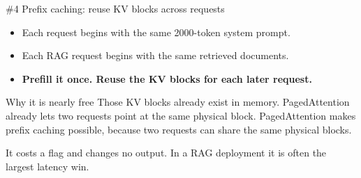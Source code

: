 \documentclass[aspectratio=169,10pt]{beamer}
\newcommand{\emphc}[1]{\textcolor{accent}{\textbf{#1}}}
\newcommand{\llmbase}{%
  \node[llmbox] (PF) at (0, 0) {Prefill};
  \node[llmbox] (KV) at (1.05, 0) {KV};
  \node[llmbox] (DC) at (1.95, 0) {Decode};
  \node[llmbox] (WP) at (0, -0.45) {Weights};
  \node[llmbox] (WD) at (1.95, -0.45) {Weights};
  \draw[llmar] (PF)--(KV); \draw[llmar] (KV)--(DC);
  \draw[llmar] (WP)--(PF); \draw[llmar] (WD)--(DC);
}
\newcommand{\llmoverlay}[1]{}  %
\newcommand{\llmdiagKV}{\llmoverlay{\begin{tikzpicture}[scale=0.65]\llmbase
  \node[llmbox, llmhl] at (1.05,0) {KV};\end{tikzpicture}}}
\begin{document}


\begin{frame}{\#4 Prefix caching: reuse KV blocks across requests}
  \llmdiagKV
  \begin{itemize}
    \item Each request begins with the same 2000-token system prompt.
    \item Each RAG request begins with the same retrieved documents.
    \item \emphc{Prefill it once. Reuse the KV blocks for each later request.}
  \end{itemize}
  \vspace{1.0em}
  \begin{center}
    \begin{minipage}{0.88\textwidth}
      \begin{block}{Why it is nearly free}
        Those KV blocks already exist in memory. PagedAttention already
        lets two requests point at the same physical block. PagedAttention makes prefix
        caching possible, because two requests can share the same physical blocks.
      \end{block}
    \end{minipage}
  \end{center}
  \vspace{0.8em}
  It costs a flag and changes no output. In a RAG deployment it is often
  the largest latency win.
\end{frame}
\end{document}
